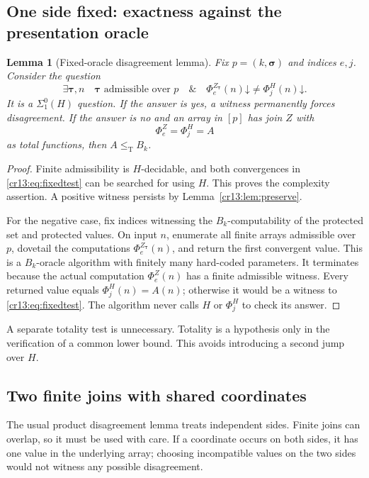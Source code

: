 \documentclass[11pt,letterpaper]{article}
\newtheorem{lemma}[theorem]{Lemma}
\theoremstyle{definition}
\theoremstyle{remark}\newtheorem{remark}[theorem]{Remark}
\numberwithin{equation}{section}
\newcommand{\leT}{\leq_{\mathrm T}}
\newcommand{\hal}{\mathord\downarrow}
\begin{document}
\subsection{One side fixed: exactness against the presentation oracle}
\begin{lemma}[Fixed-oracle disagreement lemma]\label{cr13:lem:fixed}
Fix $p=(k,\boldsymbol\sigma)$ and indices $e,j$. Consider the question
\begin{equation}\label{cr13:eq:fixedtest}
 \exists\boldsymbol\tau,n\quad
 \boldsymbol\tau\text{ admissible over }p\quad\&\quad
 \Phi_e^{Z_{\boldsymbol\tau}}(n)\hal
                \ne\Phi_j^H(n)\hal.
\end{equation}
It is a $\Sigma^0_1(H)$ question. If the answer is yes, a witness permanently forces disagreement. If the answer is no and an array in $[p]$ has join $Z$ with
\[
                         \Phi_e^Z=\Phi_j^H=A
\]
as total functions, then $A\leT B_k$.
\end{lemma}
\begin{proof}
Finite admissibility is $H$-decidable, and both convergences in \eqref{cr13:eq:fixedtest} can be searched for using $H$. This proves the complexity assertion. A positive witness persists by Lemma~\ref{cr13:lem:preserve}.

For the negative case, fix indices witnessing the $B_k$-computability of the protected set and protected values. On input $n$, enumerate all finite arrays admissible over $p$, dovetail the computations $\Phi_e^{Z_{\boldsymbol\tau}}(n)$, and return the first convergent value. This is a $B_k$-oracle algorithm with finitely many hard-coded parameters. It terminates because the actual computation $\Phi_e^Z(n)$ has a finite admissible witness. Every returned value equals $\Phi_j^H(n)=A(n)$; otherwise it would be a witness to \eqref{cr13:eq:fixedtest}. The algorithm never calls $H$ or $\Phi_j^H$ to check its answer.
\end{proof}
A separate totality test is unnecessary. Totality is a hypothesis only in the verification of a common lower bound. This avoids introducing a second jump over $H$.

\subsection{Two finite joins with shared coordinates}
The usual product disagreement lemma treats independent sides. Finite joins can overlap, so it must be used with care. If a coordinate occurs on both sides, it has one value in the underlying array; choosing incompatible values on the two sides would not witness any possible disagreement.
\end{document}
